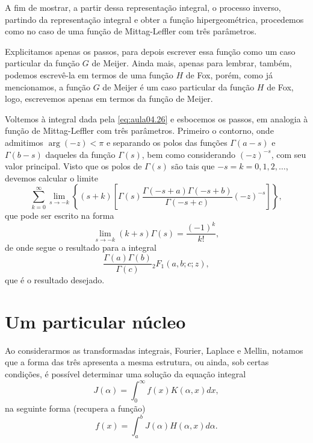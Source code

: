 {A fim de mostrar, a partir dessa representação integral, o processo inverso, partindo da representação integral e obter a função hipergeométrica, procedemos
como no caso de uma função de Mittag-Leffler com três parâmetros.

Explicitamos apenas os passos, para depois escrever essa função como um caso particular da função $G$ de Meijer. Ainda mais, apenas para lembrar, também, podemos escrevê-la em termos de uma função $H$ de Fox, porém, como já mencionamos, a função $G$ de Meijer é um caso particular da função $H$ de Fox, logo, escrevemos apenas em termos da função de Meijer.

Voltemos à integral dada pela \autoref{eq:aula04.26} e esbocemos os passos, em analogia à função de Mittag-Leffler com três parâmetros. Primeiro o contorno, onde admitimos $\arg(-z) < \pi$  e separando os polos das funções $\Gamma(a-s)$ e $\Gamma(b-s)$ daqueles da função $\Gamma(s)$, bem como considerando $(-z)^{-s}$, com seu valor principal. Visto que os polos de $\Gamma(s)$ são tais que $-s = k = 0, 1, 2, \ldots$, devemos calcular o limite
$$
\sum_{k=0}^{\infty}
\lim_{s\to-k}
\left\{
(s + k)
\left[
\Gamma(s)
\dfrac{\Gamma(-s + a)\Gamma(-s + b)}{\Gamma(-s + c)}
(-z)^{-s}
\right]\right\},
$$
que pode ser escrito na forma
$$\lim_{s\to-k}
(k + s)\Gamma(s) =
\dfrac{(-1)^{k}}{k!},$$
de onde segue o resultado para a integral
$$
\dfrac{\Gamma(a)\Gamma(b)}{\Gamma(c)}
{}_2F_1(a, b; c; z),
$$
que é o resultado desejado.
}


\section{Um particular núcleo}

Ao considerarmos as transformadas integrais, Fourier, Laplace e Mellin, notamos que a forma das três apresenta a mesma estrutura, ou ainda, sob certas condições, é possível determinar uma solução da equação integral
\begin{equation}\label{eq:aula04.27}
J(\alpha) =
\int_{0}^{\infty}
f(x) K(\alpha, x) dx,
\end{equation}
na seguinte forma (recupera a função)
\begin{equation}\label{eq:aula04.28}
f(x) =
\int_{a}^{b} J(\alpha) H(\alpha, x) d\alpha.
\end{equation}

